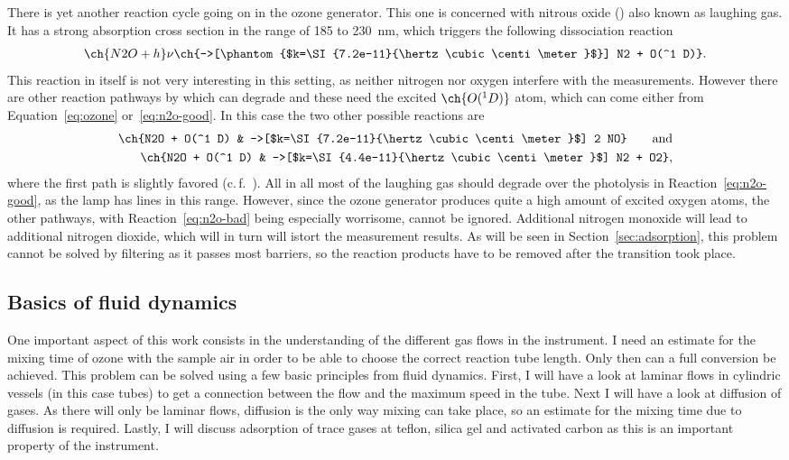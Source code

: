 There is yet another reaction cycle going on in the ozone
generator. This one is concerned with nitrous oxide () also
known as laughing gas. It has a strong absorption cross section in the
range of \num{185} to \SI{230}{\nano\meter}, which triggers the
following dissociation reaction
\begin{align}
  \ch{N2O + h}\nu \ch{->[\phantom{$k=\SI{7.2e-11}{\hertz\cubic\centi\meter}$}] N2 + O(^1 D)}.\label{eq:n2o-good}
\end{align}
This reaction in itself is not very interesting in this setting, as
neither nitrogen nor oxygen interfere with the measurements. However
there are other reaction pathways by which  can degrade and
these need the excited $\ch{O(^1D)}$ atom, which can come either from
Equation~\eqref{eq:ozone} or~\eqref{eq:n2o-good}. In this case the two
other possible reactions are
\begin{align}
  \ch{N2O + O(^1 D) & ->[$k=\SI{7.2e-11}{\hertz\cubic\centi\meter}$] 2 NO} \qquad \text{and}\label{eq:n2o-bad}\\
  \ch{N2O + O(^1 D) & ->[$k=\SI{4.4e-11}{\hertz\cubic\centi\meter}$] N2 + O2}, \nonumber
\end{align}
where the first path is slightly favored (c.\,f.~\cite{n2o}). All in
all most of the laughing gas should degrade over the photolysis in
Reaction~\eqref{eq:n2o-good}, as the lamp has lines in this range.
However, since the ozone generator produces quite a high amount of
excited oxygen atoms, the other pathways, with
Reaction~\eqref{eq:n2o-bad} being especially worrisome, cannot be
ignored. Additional nitrogen monoxide will lead to additional nitrogen
dioxide, which will in turn will istort the measurement results. As
will be seen in Section~\ref{sec:adsorption}, this problem cannot be
solved by filtering  as it passes most barriers, so the
reaction products have to be removed after the transition took place.

\subsection{Basics of fluid dynamics}
\label{sec:fluid}

One important aspect of this work consists in the understanding of the
different gas flows in the instrument. I need an estimate for the
mixing time of ozone with the sample air in order to be able to choose
the correct reaction tube length. Only then can a full conversion be
achieved. This problem can be solved using a few basic principles from
fluid dynamics. First, I will have a look at laminar flows in
cylindric vessels (in this case tubes) to get a connection between the
flow and the maximum speed in the tube. Next I will have a look at
diffusion of gases. As there will only be laminar flows, diffusion is
the only way mixing can take place, so an estimate for the mixing time
due to diffusion is required. Lastly, I will discuss adsorption of
trace gases at teflon, silica gel and activated carbon as this is an
important property of the instrument.

